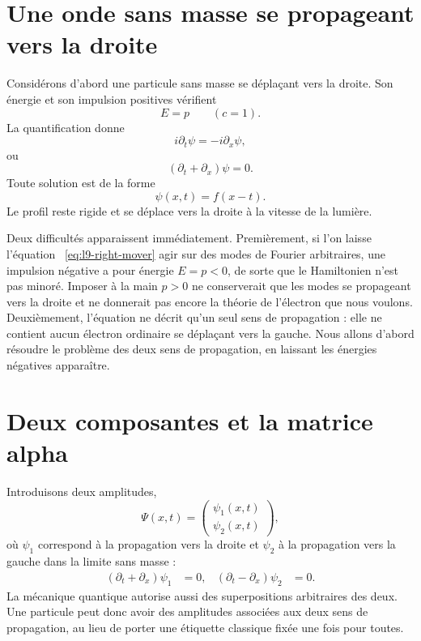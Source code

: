 \section{Une onde sans masse se propageant vers la droite}

Considérons d’abord une particule sans masse se déplaçant vers la droite. Son énergie et son impulsion positives vérifient
\begin{equation}
E=p
\qquad (c=1).
\end{equation}
La quantification donne
\begin{equation}
i\partial_t\psi=-i\partial_x\psi,
\end{equation}
ou
\begin{equation}
(\partial_t+\partial_x)\psi=0.
\label{eq:l9-right-mover}
\end{equation}
Toute solution est de la forme
\begin{equation}
\psi(x,t)=f(x-t).
\end{equation}
Le profil reste rigide et se déplace vers la droite à la vitesse de la lumière.

Deux difficultés apparaissent immédiatement. Premièrement, si l’on laisse l’équation ~\eqref{eq:l9-right-mover} agir sur des modes de Fourier arbitraires, une impulsion négative a pour énergie \(E=p<0\), de sorte que le Hamiltonien n’est pas minoré. Imposer à la main \(p>0\) ne conserverait que les modes se propageant vers la droite et ne donnerait pas encore la théorie de l’électron que nous voulons. Deuxièmement, l’équation ne décrit qu’un seul sens de propagation : elle ne contient aucun électron ordinaire se déplaçant vers la gauche. Nous allons d’abord résoudre le problème des deux sens de propagation, en laissant les énergies négatives apparaître.

\section{Deux composantes et la matrice alpha}

Introduisons deux amplitudes,
\begin{equation}
\Psi(x,t)=
\begin{pmatrix}
\psi_1(x,t)\\[3pt]
\psi_2(x,t)
\end{pmatrix},
\end{equation}
où \(\psi_1\) correspond à la propagation vers la droite et \(\psi_2\) à la propagation vers la gauche dans la limite sans masse :
\begin{align}
(\partial_t+\partial_x)\psi_1&=0,
&
(\partial_t-\partial_x)\psi_2&=0.
\end{align}
La mécanique quantique autorise aussi des superpositions arbitraires des deux. Une particule peut donc avoir des amplitudes associées aux deux sens de propagation, au lieu de porter une étiquette classique fixée une fois pour toutes.

